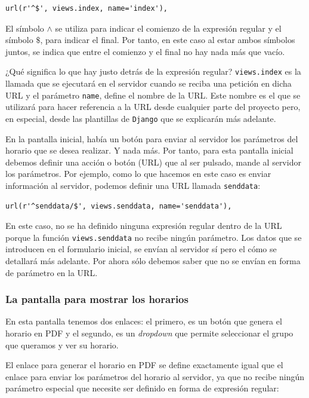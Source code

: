 \begin{verbatim}
url(r'^$', views.index, name='index'),
\end{verbatim}

El símbolo $\land$ se utiliza para indicar el comienzo de la expresión regular y el símbolo $\$$, para indicar el final. Por tanto, en este caso al estar ambos símbolos juntos, se indica que entre el comienzo y el final no hay nada más que vacío.

¿Qué significa lo que hay justo detrás de la expresión regular? \texttt{views.index} es la llamada que se ejecutará en el servidor cuando se reciba una petición en dicha URL y el parámetro \texttt{name}, define el nombre de la URL. Este nombre es el que se utilizará para hacer referencia a la URL desde cualquier parte del proyecto pero, en especial, desde las plantillas de \texttt{Django} que se explicarán más adelante.

En la pantalla inicial, había un botón para enviar al servidor los parámetros del horario que se desea realizar. Y nada más. Por tanto, para esta pantalla inicial debemos definir una acción o botón (URL) que al ser pulsado, mande al servidor los parámetros. Por ejemplo, como lo que hacemos en este caso es enviar información al servidor, podemos definir una URL llamada \texttt{senddata}:

\begin{verbatim}
url(r'^senddata/$', views.senddata, name='senddata'),
\end{verbatim}

En este caso, no se ha definido ninguna expresión regular dentro de la URL porque la función \texttt{views.senddata} no recibe ningún parámetro. Los datos que se introducen en el formulario inicial, se envían al servidor sí pero el cómo se detallará más adelante. Por ahora sólo debemos saber que no se envían en forma de parámetro en la URL.

\subsubsection{La pantalla para mostrar los horarios}
En esta pantalla tenemos dos enlaces: el primero, es un botón que genera el horario en PDF y el segundo, es un \textit{dropdown} que permite seleccionar el grupo que queramos y ver su horario.

El enlace para generar el horario en PDF se define exactamente igual que el enlace para enviar los parámetros del horario al servidor, ya que no recibe ningún parámetro especial que necesite ser definido en forma de expresión regular:

